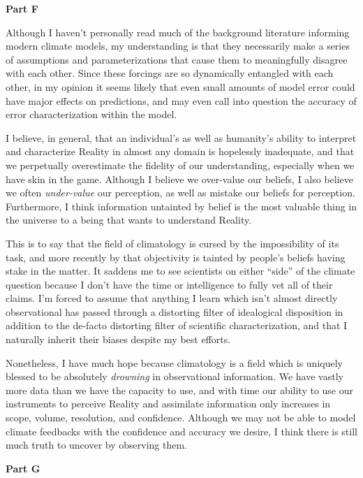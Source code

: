 \documentclass[12pt]{article}
\begin{document}
\vspace{2em}\noindent\textbf{Part F}

Although I haven't personally read much of the background literature informing modern climate models, my understanding is that they necessarily make a series of assumptions and parameterizations that cause them to meaningfully disagree with each other. Since these forcings are so dynamically entangled with each other, in my opinion it seems likely that even small amounts of model error could have major effects on predictions, and may even call into question the accuracy of error characterization within the model.

I believe, in general, that an individual's as well as humanity's ability to interpret and characterize Reality in almost any domain is hopelessly inadequate, and that we perpetually overestimate the fidelity of our understanding, especially when we have skin in the game. Although I believe we over-value our beliefs, I also believe we often \textit{under-value} our perception, as well as mistake our beliefs for perception. Furthermore, I think information untainted by belief is the most valuable thing in the universe to a being that wants to understand Reality.

This is to say that the field of climatology is cursed by the impossibility of its task, and more recently by that objectivity is tainted by people's beliefs having stake in the matter. It saddens me to see scientists on either ``side'' of the climate question because I don't have the time or intelligence to fully vet all of their claims. I'm forced to assume that anything I learn which isn't almost directly observational has passed through a distorting filter of idealogical disposition in addition to the de-facto distorting filter of scientific characterization, and that I naturally inherit their biases despite my best efforts.

Nonetheless, I have much hope because climatology is a field which is uniquely blessed to be absolutely \textit{drowning} in observational information. We have vastly more data than we have the capacity to use, and with time our ability to use our instruments to perceive Reality and assimilate information only increases in scope, volume, resolution, and confidence. Although we may not be able to model climate feedbacks with the confidence and accuracy we desire, I think there is still much truth to uncover by observing them.

\vspace{2em}\noindent\textbf{Part G}
\end{document}
